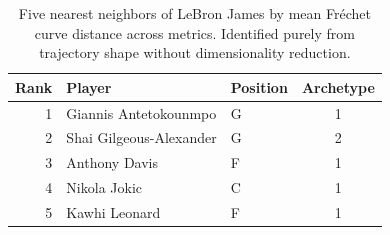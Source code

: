 \begin{table}[htbp]
  \centering\small
  \begin{tabular}{rllc}
    \toprule
    Rank & Player & Position & Archetype \\
    \midrule
    1 & Giannis Antetokounmpo & G & 1 \\
    2 & Shai Gilgeous-Alexander & G & 2 \\
    3 & Anthony Davis & F & 1 \\
    4 & Nikola Jokic & C & 1 \\
    5 & Kawhi Leonard & F & 1 \\
    \bottomrule
  \end{tabular}
  \caption{Five nearest neighbors of LeBron James by mean Fr\'{e}chet curve distance across metrics. Identified purely from trajectory shape without dimensionality reduction.}
  \label{tab:LeBron_James_frechet_curve_neighbors}
\end{table}

